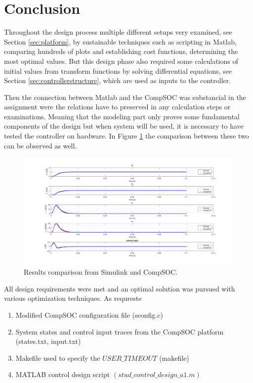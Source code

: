 \pagebreak
\section{Conclusion}
Throughout the design process multiple different setups very examined, see Section \ref{sec:platform}, by sustainable techniques such as scripting in Matlab, comparing hundreds of plots and establishing cost functions, determining the most optimal values. But this design phase also required some calculations of initial values from transform functions by solving differential equations, see Section \ref{sec:controllerstructure}, which are used as inputs to the controller. 

Then the connection between Matlab and the CompSOC was substancial in the assignment were the relations have to preserved in any calculation steps or examinations. Meaning that the modeling part only proves some fundamental components of the design but when system will be used, it is necessary to have tested the controller on hardware. In Figure \ref{fig:finalresult} the comparison between these two can be observed as well.

\begin{figure}[h]
	\begin{center}
		\includegraphics[width=\linewidth]{img/finalresult}
		\caption{Results comparison from Simulink and CompSOC.}
		\label{fig:finalresult}
	\end{center}
\end{figure}

All design requirements were met and an optimal solution was pursued with various optimization techniques. As requreste

\begin{enumerate}
	\item Modified CompSOC configuration file (sconfig.c)
	\item System states	and	control	input traces from the CompSOC platform (states.txt,	input.txt)
	\item Makefile used	to	specify	the	$USER\_TIMEOUT$	(makefile)
	\item MATLAB	control	design	script	$(stud\_control\_design\_a1.m)$
\end{enumerate}
